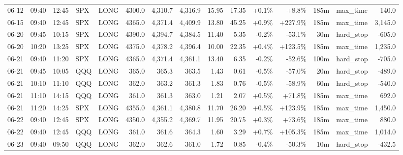 \documentclass[11pt,a4paper,twoside]{article}
\begin{document}
\begin{landscape}
\begin{center}
\begin{longtable}{>{\color{txtmain}}l l l l l r r r r r r r r >{\color{txtmain}}l r}
06-12 & 09:40 & 12:45 & SPX & LONG & 4300.0 & 4,310.7 & 4,316.9 & 15.95 & 17.35 & \textcolor{wingreen}{+0.1\%} & \textcolor{wingreen}{+8.8\%} & 185m & max\_time & \textcolor{wingreen}{140.0} \\
06-15 & 09:40 & 12:45 & SPX & LONG & 4365.0 & 4,371.4 & 4,409.9 & 13.80 & 45.25 & \textcolor{wingreen}{+0.9\%} & \textcolor{wingreen}{+227.9\%} & 185m & max\_time & \textcolor{wingreen}{3,145.0} \\
06-20 & 09:45 & 10:15 & SPX & LONG & 4390.0 & 4,394.7 & 4,384.5 & 11.40 & 5.35 & \textcolor{lossred}{-0.2\%} & \textcolor{lossred}{-53.1\%} & 30m & hard\_stop & \textcolor{lossred}{-605.0} \\
06-20 & 10:20 & 13:25 & SPX & LONG & 4375.0 & 4,378.2 & 4,396.4 & 10.00 & 22.35 & \textcolor{wingreen}{+0.4\%} & \textcolor{wingreen}{+123.5\%} & 185m & max\_time & \textcolor{wingreen}{1,235.0} \\
06-21 & 09:40 & 11:20 & SPX & LONG & 4365.0 & 4,371.4 & 4,361.1 & 13.40 & 6.35 & \textcolor{lossred}{-0.2\%} & \textcolor{lossred}{-52.6\%} & 100m & hard\_stop & \textcolor{lossred}{-705.0} \\
06-21 & 09:45 & 10:05 & QQQ & LONG & 365.0 & 365.3 & 363.5 & 1.43 & 0.61 & \textcolor{lossred}{-0.5\%} & \textcolor{lossred}{-57.0\%} & 20m & hard\_stop & \textcolor{lossred}{-489.0} \\
06-21 & 10:10 & 11:10 & QQQ & LONG & 362.0 & 363.2 & 361.3 & 1.83 & 0.76 & \textcolor{lossred}{-0.5\%} & \textcolor{lossred}{-58.9\%} & 60m & hard\_stop & \textcolor{lossred}{-540.0} \\
06-21 & 11:10 & 14:15 & QQQ & LONG & 361.0 & 361.3 & 363.0 & 1.21 & 2.07 & \textcolor{wingreen}{+0.5\%} & \textcolor{wingreen}{+71.8\%} & 185m & max\_time & \textcolor{wingreen}{692.0} \\
06-21 & 11:20 & 14:25 & SPX & LONG & 4355.0 & 4,361.1 & 4,380.8 & 11.70 & 26.20 & \textcolor{wingreen}{+0.5\%} & \textcolor{wingreen}{+123.9\%} & 185m & max\_time & \textcolor{wingreen}{1,450.0} \\
06-22 & 09:40 & 12:45 & SPX & LONG & 4350.0 & 4,355.2 & 4,369.7 & 11.95 & 20.75 & \textcolor{wingreen}{+0.3\%} & \textcolor{wingreen}{+73.6\%} & 185m & max\_time & \textcolor{wingreen}{880.0} \\
06-22 & 09:40 & 12:45 & QQQ & LONG & 361.0 & 361.6 & 364.3 & 1.60 & 3.29 & \textcolor{wingreen}{+0.7\%} & \textcolor{wingreen}{+105.3\%} & 185m & max\_time & \textcolor{wingreen}{1,014.0} \\
06-23 & 09:40 & 09:50 & QQQ & LONG & 362.0 & 362.6 & 361.0 & 1.72 & 0.85 & \textcolor{lossred}{-0.4\%} & \textcolor{lossred}{-50.3\%} & 10m & hard\_stop & \textcolor{lossred}{-432.5} \\

\end{longtable}
\end{center}
\end{landscape}
\end{document}
